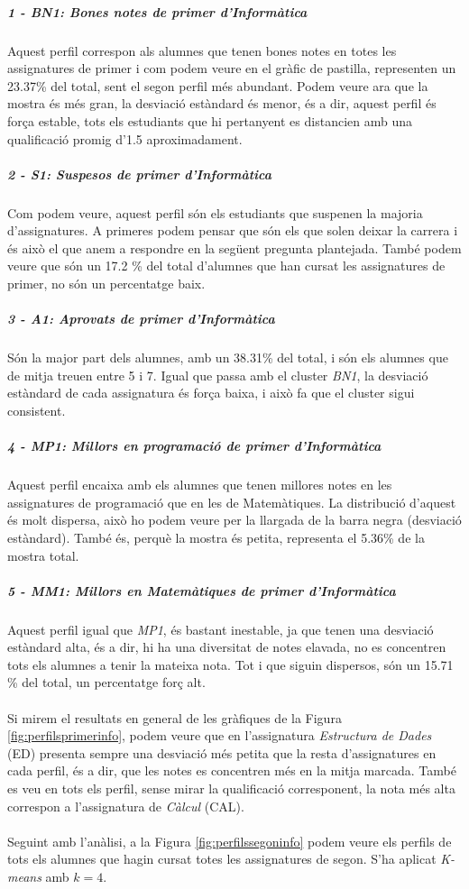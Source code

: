 \documentclass[12pt,a4paper,catalan]{article}
\begin{document}
\subparagraph{1 - BN1: Bones notes de primer d'Informàtica}
Aquest perfil correspon als alumnes que tenen bones notes en totes les assignatures de primer i com podem veure en el gràfic de pastilla, representen un 23.37\% del total, sent el segon perfil més abundant. Podem veure ara que la mostra és més gran, la desviació estàndard és menor, és a dir, aquest perfil és força estable, tots els estudiants que hi pertanyent es distancien amb una qualificació promig d'1.5 aproximadament.

\subparagraph{2 - S1: Suspesos de primer d'Informàtica}
Com podem veure, aquest perfil són els estudiants que suspenen la majoria d'assignatures. A primeres podem pensar que són els que solen deixar la carrera i és això el que anem a respondre en la següent pregunta plantejada. També podem veure que són un 17.2 \% del total d'alumnes que han cursat les assignatures de primer, no són un percentatge baix.

\subparagraph{3 - A1: Aprovats de primer d'Informàtica}
Són la major part dels alumnes, amb un 38.31\% del total, i són els alumnes que de mitja treuen entre 5 i 7. Igual que passa amb el cluster \textit{BN1}, la desviació estàndard de cada assignatura és força baixa, i això fa que el cluster sigui consistent.

\subparagraph{4 - MP1: Millors en programació de primer d'Informàtica} 
Aquest perfil encaixa amb els alumnes que tenen millores notes en les assignatures de programació que en les de Matemàtiques. La distribució d'aquest és molt dispersa, això ho podem veure per la llargada de la barra negra (desviació estàndard). També és, perquè la mostra és petita, representa el 5.36\% de la mostra total.

\subparagraph{5 - MM1: Millors en Matemàtiques de primer d'Informàtica}
Aquest perfil igual que \textit{MP1}, és bastant inestable, ja que tenen una desviació estàndard alta, és a dir, hi ha una diversitat de notes elavada, no es concentren tots els alumnes a tenir la mateixa nota. Tot i que siguin dispersos, són un 15.71 \% del total, un percentatge forç alt.
\\
\\
Si mirem el resultats en general de les gràfiques de la Figura \ref{fig:perfilsprimerinfo}, podem veure que en l'assignatura \textit{Estructura de Dades} (ED) presenta sempre una desviació més petita que la resta d'assignatures en cada perfil, és a dir, que les notes es concentren més en la mitja marcada. També es veu en tots els perfil, sense mirar la qualificació corresponent, la nota més alta correspon a l'assignatura de \textit{Càlcul} (CAL).
\\
\\
Seguint amb l'anàlisi, a la Figura \ref{fig:perfilssegoninfo} podem veure els perfils de tots els alumnes que hagin cursat totes les assignatures de segon. S'ha aplicat \textit{K-means} amb $k=4$.
\end{document}
